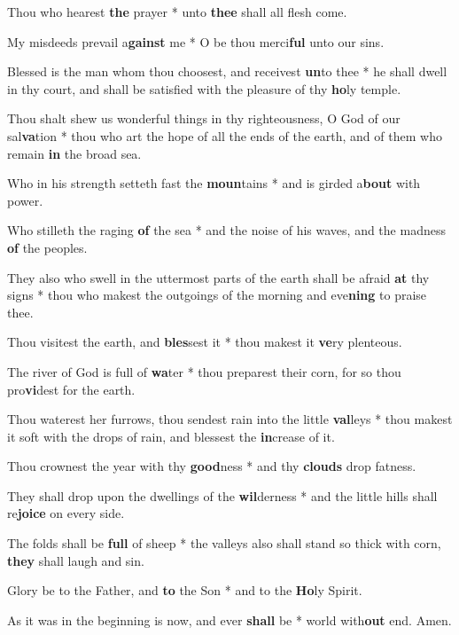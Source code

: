 \begin{multicols}{2}
	Thou who hearest \textbf{the} prayer * unto \textbf{thee} shall all flesh come.
	
	My misdeeds prevail a\textbf{gainst} me * O be thou merci\textbf{ful} unto our sins.
	
	Blessed is the man whom thou choosest, and receivest \textbf{un}to thee * he shall dwell in thy court, and shall be satisfied with the pleasure of thy \textbf{ho}ly temple.
	
	Thou shalt shew us wonderful things in thy righteousness, O God of our sal\textbf{va}tion * thou who art the hope of all the ends of the earth, and of them who remain \textbf{in} the broad sea.
	
	Who in his strength setteth fast the \textbf{moun}tains * and is girded a\textbf{bout} with power.
	
	Who stilleth the raging \textbf{of} the sea * and the noise of his waves, and the madness \textbf{of} the peoples.
	
	They also who swell in the uttermost parts of the earth shall be afraid \textbf{at} thy signs * thou who makest the outgoings of the morning and eve\textbf{ning} to praise thee.
	
	Thou visitest the earth, and \textbf{bles}sest it * thou makest it \textbf{ve}ry plenteous.
	
	The river of God is full of \textbf{wa}ter * thou preparest their corn, for so thou pro\textbf{vi}dest for the earth.
	
	Thou waterest her furrows, thou sendest rain into the little \textbf{val}leys * thou makest it soft with the drops of rain, and blessest the \textbf{in}crease of it.
	
	Thou crownest the year with thy \textbf{good}ness * and thy \textbf{clouds} drop fatness.
	
	They shall drop upon the dwellings of the \textbf{wil}derness * and the little hills shall re\textbf{joice} on every side.
	
	The folds shall be \textbf{full} of sheep * the valleys also shall stand so thick with corn, \textbf{they} shall laugh and sin.
	
	Glory be to the Father, and \textbf{to} the Son * and to the \textbf{Ho}ly Spirit.
	
	As it was in the beginning is now, and ever \textbf{shall} be * world with\textbf{out} end. Amen.
\end{multicols}